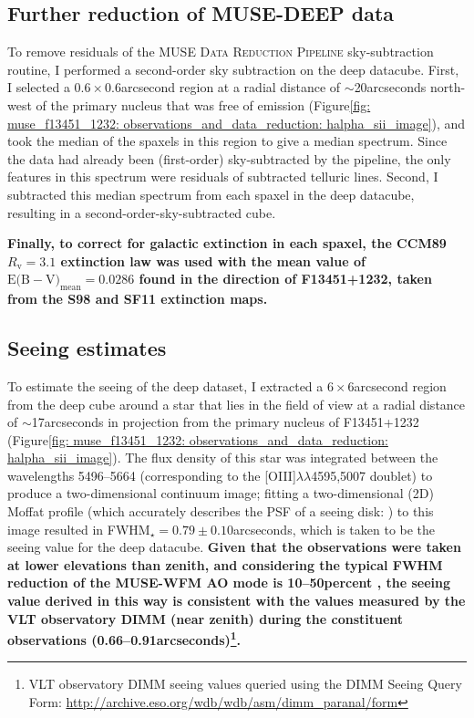 \subsection{Further reduction of MUSE-DEEP data}
\label{section: section: muse_f13451_1232: observations_and_data_reduction: further_reduction}

To remove residuals of the \textsc{MUSE Data Reduction Pipeline} sky-subtraction routine, I performed a second-order sky subtraction on the deep datacube. First, I selected a $0.6\times0.6$\;arcsecond region at a radial distance of $\sim$20\;arcseconds north-west of the primary nucleus that was free of emission (Figure\;\ref{fig: muse_f13451_1232: observations_and_data_reduction: halpha_sii_image}), and took the median of the spaxels in this region to give a median spectrum. Since the data had already been (first-order) sky-subtracted by the pipeline, the only features in this spectrum were residuals of subtracted telluric lines. Second, I subtracted this median spectrum from each spaxel in the deep datacube, resulting in a second-order-sky-subtracted cube.

\textbf{Finally, to correct for galactic extinction in each spaxel, the CCM89 $R_\mathrm{v}=3.1$ extinction law was used with the mean value of $\mathrm{E(B}-\mathrm{V)}_\mathrm{mean}=0.0286$ found in the direction of F13451+1232, taken from the S98 and SF11 extinction maps.}

\subsection{Seeing estimates}
\label{section: muse_f13451_1232: observations_and_data_reduction: seeing}

To estimate the seeing of the deep dataset, I extracted a $6\times6$\;arcsecond region from the deep cube around a star that lies in the field of view at a radial distance of $\sim$17\;arcseconds in projection from the primary nucleus of F13451+1232 (Figure\;\ref{fig: muse_f13451_1232: observations_and_data_reduction: halpha_sii_image}). The flux density of this star was integrated between the wavelengths 5496--5664\;{\AA} (corresponding to the [OIII]$\lambda\lambda$4595,5007 doublet) to produce a two-dimensional continuum image; fitting a two-dimensional (2D) Moffat profile (which accurately describes the PSF of a seeing disk: \citealt{Moffat1969}) to this image resulted in FWHM$_\star=0.79\pm0.10$\;arcseconds, which is taken to be the seeing value for the deep datacube. \textbf{Given that the observations were taken at lower elevations than zenith, and considering the typical FWHM reduction of the MUSE-WFM AO mode is 10--50\;per\;cent \citep{Fusco2020}, the seeing value derived in this way is consistent with the values measured by the VLT observatory DIMM (near zenith) during the constituent observations (0.66--0.91\;arcseconds)\footnote{VLT observatory DIMM seeing values queried using the DIMM Seeing Query Form: \url{http://archive.eso.org/wdb/wdb/asm/dimm_paranal/form}}.}

